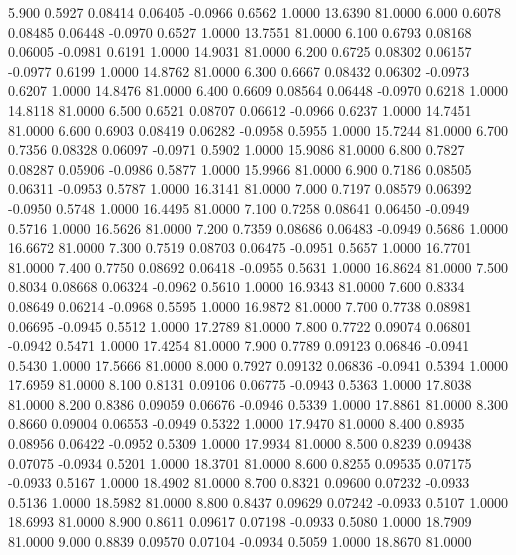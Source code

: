    5.900   0.5927   0.08414   0.06405  -0.0966   0.6562   1.0000  13.6390  81.0000
   6.000   0.6078   0.08485   0.06448  -0.0970   0.6527   1.0000  13.7551  81.0000
   6.100   0.6793   0.08168   0.06005  -0.0981   0.6191   1.0000  14.9031  81.0000
   6.200   0.6725   0.08302   0.06157  -0.0977   0.6199   1.0000  14.8762  81.0000
   6.300   0.6667   0.08432   0.06302  -0.0973   0.6207   1.0000  14.8476  81.0000
   6.400   0.6609   0.08564   0.06448  -0.0970   0.6218   1.0000  14.8118  81.0000
   6.500   0.6521   0.08707   0.06612  -0.0966   0.6237   1.0000  14.7451  81.0000
   6.600   0.6903   0.08419   0.06282  -0.0958   0.5955   1.0000  15.7244  81.0000
   6.700   0.7356   0.08328   0.06097  -0.0971   0.5902   1.0000  15.9086  81.0000
   6.800   0.7827   0.08287   0.05906  -0.0986   0.5877   1.0000  15.9966  81.0000
   6.900   0.7186   0.08505   0.06311  -0.0953   0.5787   1.0000  16.3141  81.0000
   7.000   0.7197   0.08579   0.06392  -0.0950   0.5748   1.0000  16.4495  81.0000
   7.100   0.7258   0.08641   0.06450  -0.0949   0.5716   1.0000  16.5626  81.0000
   7.200   0.7359   0.08686   0.06483  -0.0949   0.5686   1.0000  16.6672  81.0000
   7.300   0.7519   0.08703   0.06475  -0.0951   0.5657   1.0000  16.7701  81.0000
   7.400   0.7750   0.08692   0.06418  -0.0955   0.5631   1.0000  16.8624  81.0000
   7.500   0.8034   0.08668   0.06324  -0.0962   0.5610   1.0000  16.9343  81.0000
   7.600   0.8334   0.08649   0.06214  -0.0968   0.5595   1.0000  16.9872  81.0000
   7.700   0.7738   0.08981   0.06695  -0.0945   0.5512   1.0000  17.2789  81.0000
   7.800   0.7722   0.09074   0.06801  -0.0942   0.5471   1.0000  17.4254  81.0000
   7.900   0.7789   0.09123   0.06846  -0.0941   0.5430   1.0000  17.5666  81.0000
   8.000   0.7927   0.09132   0.06836  -0.0941   0.5394   1.0000  17.6959  81.0000
   8.100   0.8131   0.09106   0.06775  -0.0943   0.5363   1.0000  17.8038  81.0000
   8.200   0.8386   0.09059   0.06676  -0.0946   0.5339   1.0000  17.8861  81.0000
   8.300   0.8660   0.09004   0.06553  -0.0949   0.5322   1.0000  17.9470  81.0000
   8.400   0.8935   0.08956   0.06422  -0.0952   0.5309   1.0000  17.9934  81.0000
   8.500   0.8239   0.09438   0.07075  -0.0934   0.5201   1.0000  18.3701  81.0000
   8.600   0.8255   0.09535   0.07175  -0.0933   0.5167   1.0000  18.4902  81.0000
   8.700   0.8321   0.09600   0.07232  -0.0933   0.5136   1.0000  18.5982  81.0000
   8.800   0.8437   0.09629   0.07242  -0.0933   0.5107   1.0000  18.6993  81.0000
   8.900   0.8611   0.09617   0.07198  -0.0933   0.5080   1.0000  18.7909  81.0000
   9.000   0.8839   0.09570   0.07104  -0.0934   0.5059   1.0000  18.8670  81.0000
